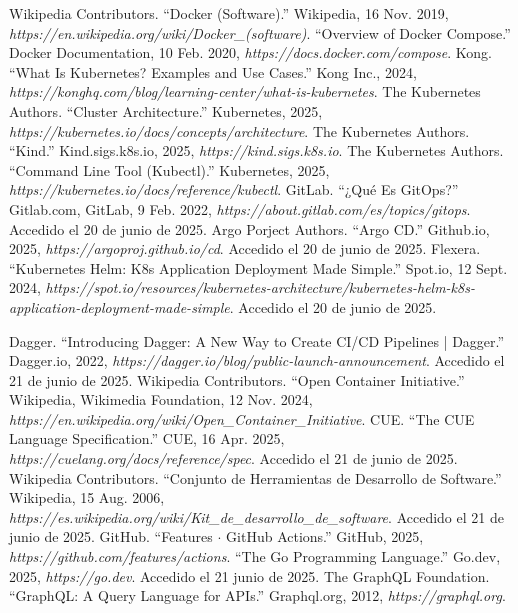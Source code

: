 \begin{thebibliography}{99}
 Wikipedia Contributors. ``Docker (Software).'' Wikipedia, 16 Nov. 2019, {\it https://en.wikipedia.org/wiki/Docker\_(software)}.
 ``Overview of Docker Compose.'' Docker Documentation, 10 Feb. 2020, {\it https://docs.docker.com/compose}.
 Kong. ``What Is Kubernetes? Examples and Use Cases.'' Kong Inc., 2024, {\it https://konghq.com/blog/learning-center/what-is-kubernetes}.
 The Kubernetes Authors. ``Cluster Architecture.'' Kubernetes, 2025, {\it https://kubernetes.io/docs/concepts/architecture}.
 The Kubernetes Authors. ``Kind.'' Kind.sigs.k8s.io, 2025, {\it https://kind.sigs.k8s.io}.
 The Kubernetes Authors. ``Command Line Tool (Kubectl).'' Kubernetes, 2025, {\it https://kubernetes.io/docs/reference/kubectl}.
 GitLab. ``¿Qué Es GitOps?'' Gitlab.com, GitLab, 9 Feb. 2022, {\it https://about.gitlab.com/es/topics/gitops}. Accedido el 20 de junio de 2025.
 Argo Porject Authors. ``Argo CD.'' Github.io, 2025, {\it https://argoproj.github.io/cd}. Accedido el 20 de junio de 2025.
 Flexera. ``Kubernetes Helm: K8s Application Deployment Made Simple.'' Spot.io, 12 Sept. 2024, {\it https://spot.io/resources/kubernetes-architecture/kubernetes-helm-k8s-application-deployment-made-simple}. Accedido el 20 de junio de 2025.

 Dagger. ``Introducing Dagger: A New Way to Create CI/CD Pipelines | Dagger.'' Dagger.io, 2022, {\it https://dagger.io/blog/public-launch-announcement}. Accedido el 21 de junio de 2025.
 Wikipedia Contributors. ``Open Container Initiative.'' Wikipedia, Wikimedia Foundation, 12 Nov. 2024, {\it https://en.wikipedia.org/wiki/Open\_Container\_Initiative}.
 CUE. ``The CUE Language Specification.'' CUE, 16 Apr. 2025, {\it https://cuelang.org/docs/reference/spec}. Accedido el 21 de junio de 2025.
 Wikipedia Contributors. ``Conjunto de Herramientas de Desarrollo de Software.'' Wikipedia, 15 Aug. 2006, {\it https://es.wikipedia.org/wiki/Kit\_de\_desarrollo\_de\_software}. Accedido el 21 de junio de 2025.
 GitHub. ``Features $\cdot$ GitHub Actions.'' GitHub, 2025, {\it https://github.com/features/actions}.
 ``The Go Programming Language.'' Go.dev, 2025, {\it https://go.dev}. Accedido el 21 junio de 2025.
 The GraphQL Foundation. ``GraphQL: A Query Language for APIs.'' Graphql.org, 2012, {\it https://graphql.org}.


\end{thebibliography}
